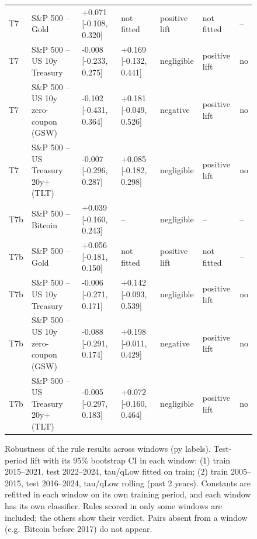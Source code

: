 \begin{figure}[t]
{\begin{tabular}{lllllll}
T7 & S\&P 500 -- Gold & +0.071 [-0.108, 0.320] & not fitted & positive lift & not fitted & -- \\
T7 & S\&P 500 -- US 10y Treasury & -0.008 [-0.233, 0.275] & +0.169 [-0.132, 0.441] & negligible & positive lift & no \\
T7 & S\&P 500 -- US 10y zero-coupon (GSW) & -0.102 [-0.431, 0.364] & +0.181 [-0.049, 0.526] & negative & positive lift & no \\
T7 & S\&P 500 -- US Treasury 20y+ (TLT) & -0.007 [-0.296, 0.287] & +0.085 [-0.182, 0.298] & negligible & positive lift & no \\
T7b & S\&P 500 -- Bitcoin & +0.039 [-0.160, 0.243] & -- & negligible & -- & -- \\
T7b & S\&P 500 -- Gold & +0.056 [-0.181, 0.150] & not fitted & positive lift & not fitted & -- \\
T7b & S\&P 500 -- US 10y Treasury & -0.006 [-0.271, 0.171] & +0.142 [-0.093, 0.539] & negligible & positive lift & no \\
T7b & S\&P 500 -- US 10y zero-coupon (GSW) & -0.088 [-0.291, 0.174] & +0.198 [-0.011, 0.429] & negative & positive lift & no \\
T7b & S\&P 500 -- US Treasury 20y+ (TLT) & -0.005 [-0.297, 0.183] & +0.072 [-0.160, 0.464] & negligible & positive lift & no \\
\bottomrule
\end{tabular}
}
\caption{Robustness of the rule results across windows (py labels). Test-period lift with its 95\% bootstrap CI in each window: (1) train 2015–2021, test 2022–2024, tau/qLow fitted on train; (2) train 2005–2015, test 2016–2024, tau/qLow rolling (past 2 years). Constants are refitted in each window on its own training period, and each window has its own classifier. Rules scored in only some windows are included; the others show their verdict. Pairs absent from a window (e.g.\ Bitcoin before 2017) do not appear.}
\label{tab:robustness}
\end{figure}
